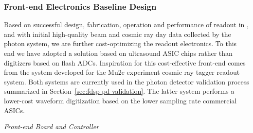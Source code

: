 \subsubsection{Front-end Electronics Baseline Design}
\label{sec:electronics}

Based on successful design, fabrication, operation and performance of  readout in , and with initial high-quality beam and cosmic ray day data collected by the  photon system, we are %
further cost-optimizing the readout electronics.  To this end we have adopted a solution based on ultrasound ASIC chips rather than digitizers based on flash ADCs. Inspiration for %
this cost-effective front-end comes from the system developed for the Mu2e experiment cosmic ray tagger readout system.
Both systems are currently used in the photon detector validation process summarized in Section~\ref{sec:fdsp-pd-validation}. The latter system 
performs a lower-cost waveform digitization based on the lower sampling rate commercial ASICs.


\textit{\it Front-end Board and Controller}

